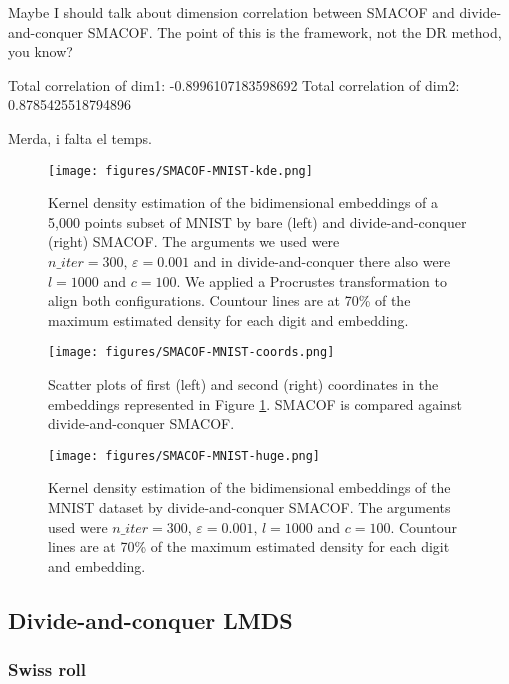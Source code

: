 Maybe I should talk about dimension correlation between SMACOF and divide-and-conquer SMACOF. The point of this is the framework, not the DR method, you know?

Total correlation of dim1: -0.8996107183598692
Total correlation of dim2: 0.8785425518794896

Merda, i falta el temps.

\begin{figure}[ht]
    \centering
    \texttt{[image: figures/SMACOF-MNIST-kde.png]}
    \caption{Kernel density estimation of the bidimensional embeddings of a 5,000 points subset of MNIST \citep{Cohen2017} by bare (left) and divide-and-conquer (right) SMACOF. The arguments we used were $n\_iter = 300,\, \varepsilon = 0.001$ and in divide-and-conquer there also were $l=1000$ and $c=100$. We applied a Procrustes transformation to align both configurations. Countour lines are at 70\% of the maximum estimated density for each digit and embedding.}
    \label{fig:SMACOF-MNIST-kde}
\end{figure}

\begin{figure}[ht]
    \centering
    \texttt{[image: figures/SMACOF-MNIST-coords.png]}
    \caption{Scatter plots of first (left) and second (right) coordinates in the embeddings represented in Figure \ref{fig:SMACOF-MNIST-kde}. SMACOF is compared against divide-and-conquer SMACOF.}
    \label{fig:SMACOF-MNIST-coords}
\end{figure}

\begin{figure}[ht]
    \centering
    \texttt{[image: figures/SMACOF-MNIST-huge.png]}
    \caption{Kernel density estimation of the bidimensional embeddings of the MNIST dataset \citep{Cohen2017} by divide-and-conquer SMACOF. The arguments used were $n\_iter = 300,\, \varepsilon = 0.001, \, l=1000$ and $c=100$. Countour lines are at 70\% of the maximum estimated density for each digit and embedding.}
    \label{fig:SMACOF-MNIST-huge}
\end{figure}

\subsection{Divide-and-conquer LMDS}

\subsubsection{Swiss roll}

